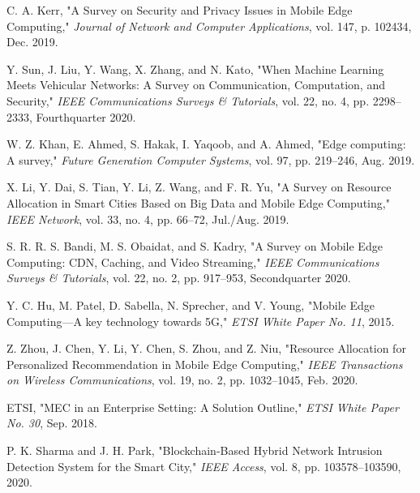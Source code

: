 \documentclass[journal,twocolumn]{IEEEtran}
\begin{document}
\begin{thebibliography}{30}
C. A. Kerr, "A Survey on Security and Privacy Issues in Mobile Edge Computing," \emph{Journal of Network and Computer Applications}, vol. 147, p. 102434, Dec. 2019.

Y. Sun, J. Liu, Y. Wang, X. Zhang, and N. Kato, "When Machine Learning Meets Vehicular Networks: A Survey on Communication, Computation, and Security," \emph{IEEE Communications Surveys \& Tutorials}, vol. 22, no. 4, pp. 2298--2333, Fourthquarter 2020.

W. Z. Khan, E. Ahmed, S. Hakak, I. Yaqoob, and A. Ahmed, "Edge computing: A survey," \emph{Future Generation Computer Systems}, vol. 97, pp. 219--246, Aug. 2019.

X. Li, Y. Dai, S. Tian, Y. Li, Z. Wang, and F. R. Yu, "A Survey on Resource Allocation in Smart Cities Based on Big Data and Mobile Edge Computing," \emph{IEEE Network}, vol. 33, no. 4, pp. 66--72, Jul./Aug. 2019.

S. R. R. S. Bandi, M. S. Obaidat, and S. Kadry, "A Survey on Mobile Edge Computing: CDN, Caching, and Video Streaming," \emph{IEEE Communications Surveys \& Tutorials}, vol. 22, no. 2, pp. 917--953, Secondquarter 2020.

Y. C. Hu, M. Patel, D. Sabella, N. Sprecher, and V. Young, "Mobile Edge Computing—A key technology towards 5G," \emph{ETSI White Paper No. 11}, 2015.

Z. Zhou, J. Chen, Y. Li, Y. Chen, S. Zhou, and Z. Niu, "Resource Allocation for Personalized Recommendation in Mobile Edge Computing," \emph{IEEE Transactions on Wireless Communications}, vol. 19, no. 2, pp. 1032--1045, Feb. 2020.

ETSI, "MEC in an Enterprise Setting: A Solution Outline," \emph{ETSI White Paper No. 30}, Sep. 2018.

P. K. Sharma and J. H. Park, "Blockchain-Based Hybrid Network Intrusion Detection System for the Smart City," \emph{IEEE Access}, vol. 8, pp. 103578--103590, 2020.

\end{thebibliography}

\balance
\end{document}
